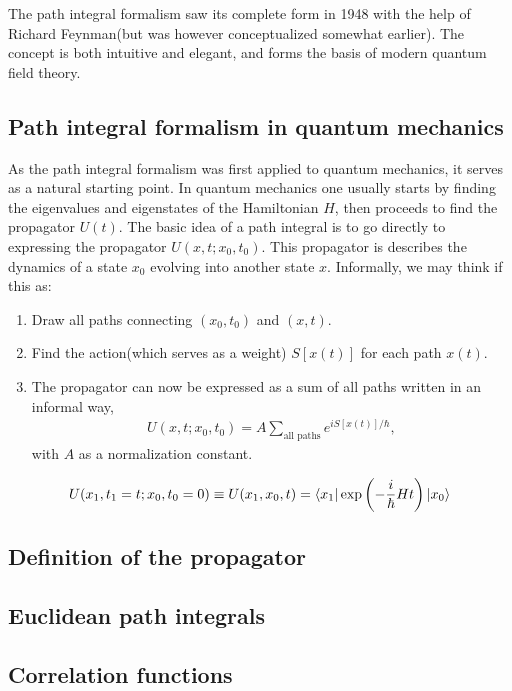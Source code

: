 The path integral formalism saw its complete form in 1948 with the help of Richard Feynman\cite{RevModPhys.20.367}(but was however conceptualized somewhat earlier). The concept is both intuitive and elegant, and forms the basis of modern quantum field theory.

\subsection{Path integral formalism in quantum mechanics}
As the path integral formalism was first applied to quantum mechanics, it serves as a natural starting point. In quantum mechanics one usually starts by finding the eigenvalues and eigenstates of the Hamiltonian $H$, then proceeds to find the propagator $U(t)$. The basic idea of a path integral is to go directly to expressing the propagator $U(x,t;x_0,t_0)$. This propagator is describes the dynamics of a state $x_0$ evolving into another state $x$. Informally, we may think if this as:

\begin{enumerate}
	\item Draw all paths connecting $(x_0,t_0)$ and $(x,t)$.
	\item Find the action(which serves as a weight) $S[x(t)]$ for each path $x(t)$.
	\item The propagator can now be expressed as a sum of all paths written in an informal way,
	\begin{align*}
		U(x,t;x_0,t_0) = A \sum_\text{all paths} e^{iS[x(t)]/\hbar},
	\end{align*}
	with $A$ as a normalization constant.
\end{enumerate}

\begin{align}
	U(x_1,t_1=t;x_0,t_0=0) \equiv U(x_1,x_0,t) = \langle{x_1}| \exp \left( -\frac{i}{\hbar} H t \right) |{x_0}\rangle
	\label{eq:propagator-definition-qm}
\end{align}

\subsection{Definition of the propagator}

\subsection{Euclidean path integrals}

\subsection{Correlation functions}

